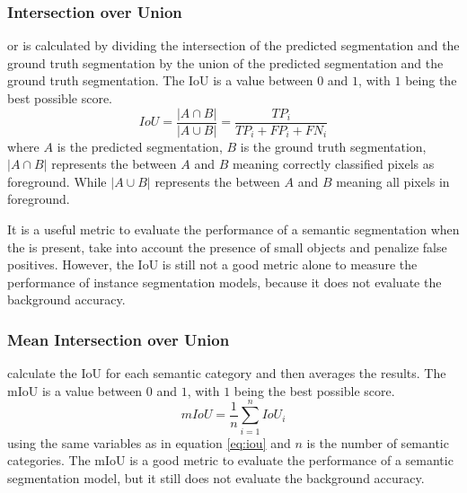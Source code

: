     \subsubsection{Intersection over Union}
      
       or  is calculated by dividing
      the intersection of the predicted segmentation and the ground truth segmentation by the union
      of the predicted segmentation and the ground truth segmentation\cite{long2015fully}.
      The IoU is a value between $0$ and $1$, with $1$ being the best possible score.
      \begin{equation}
        \label{eq:iou}
        IoU = \frac{{|A \cap B|}}{{|A \cup B|}} = \frac{TP_i}{TP_i + FP_i + FN_i}
      \end{equation}
      where $A$ is the predicted segmentation, $B$ is the ground truth segmentation,
      $|A \cap B|$ represents the  between $A$ and $B$ meaning
      correctly classified pixels as foreground. While $|A \cup B|$ represents the
       between $A$ and $B$ meaning all pixels in foreground.

      It is a useful metric to evaluate the performance of a semantic segmentation
      when the  is present, take into account the
      presence of small objects and penalize false positives. However, the IoU
      is still not a good metric alone to measure the performance of instance
      segmentation models, because it does not evaluate the background accuracy.

    \subsubsection{Mean Intersection over Union}

       calculate the IoU for each semantic
      category and then averages the results\cite{long2015fully}. The mIoU is a value between $0$ and $1$,
      with $1$ being the best possible score.
      \begin{equation}
        \label{eq:miou}
        mIoU = \frac{1}{n} \sum_{i=1}^{n} IoU_i
      \end{equation}
      using the same variables as in equation \ref{eq:iou} and $n$ is the number of
      semantic categories. The mIoU is a good metric to evaluate the performance of
      a semantic segmentation model, but it still does not evaluate the background
      accuracy.

